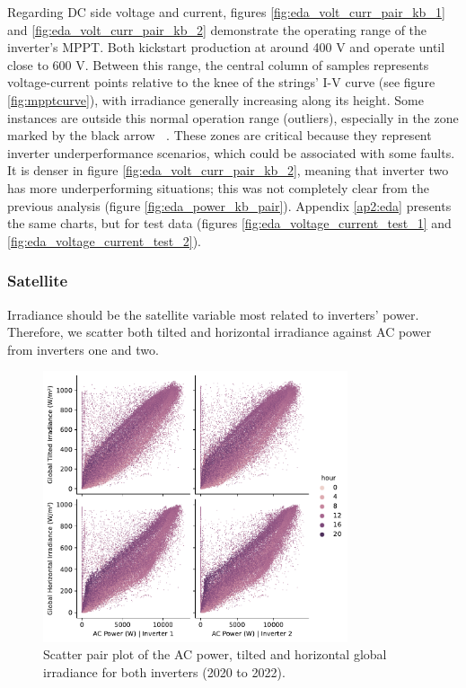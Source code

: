 Regarding DC side voltage and current, figures \ref{fig:eda_volt_curr_pair_kb_1} and \ref{fig:eda_volt_curr_pair_kb_2} demonstrate the operating range of the inverter's MPPT. Both kickstart production at around 400 V and operate until close to 600 V. Between this range, the central column of samples represents voltage-current points relative to the knee of the strings' I-V curve (see figure \ref{fig:mpptcurve}), with irradiance generally increasing along its height. Some instances are outside this normal operation range (outliers), especially in the zone marked by the black arrow \textcircled{}\textcircled{}. These zones are critical because they represent inverter underperformance scenarios, which could be associated with some faults. It is denser in figure \ref{fig:eda_volt_curr_pair_kb_2}, meaning that inverter two has more underperforming situations; this was not completely clear from the previous analysis (figure \ref{fig:eda_power_kb_pair}). Appendix \ref{ap2:eda} presents the same charts, but for test data (figures \ref{fig:eda_voltage_current_test_1} and \ref{fig:eda_voltage_current_test_2}).

\subsubsection{Satellite} \label{subsubsec:eda_sat}

Irradiance should be the satellite variable most related to inverters' power. Therefore, we scatter both tilted and horizontal irradiance against AC power from inverters one and two.

\begin{figure}[h!]
    \centering
    \includegraphics[width=0.8\textwidth]{figures/chapter5/analysis/08_power_irrad_pairplot_scatter_kb.pdf}
    \caption{Scatter pair plot of the AC power, tilted and horizontal global irradiance for both inverters (2020 to 2022).}
    \label{fig:eda_power_irrad_pair_kb}
\end{figure}

